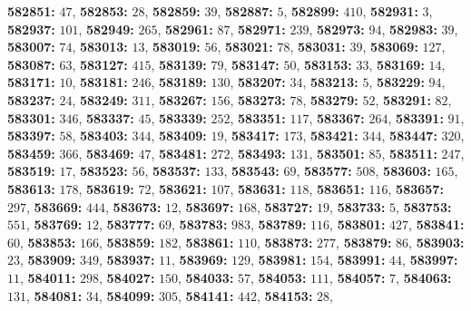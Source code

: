 \textsf{\bfseries 582851:} $47$, \textsf{\bfseries 582853:} $28$, \textsf{\bfseries 582859:} $39$, \textsf{\bfseries 582887:} $5$, \textsf{\bfseries 582899:} $410$, \textsf{\bfseries 582931:} $3$, \textsf{\bfseries 582937:} $101$, \textsf{\bfseries 582949:} $265$, \textsf{\bfseries 582961:} $87$, \textsf{\bfseries 582971:} $239$, \textsf{\bfseries 582973:} $94$, \textsf{\bfseries 582983:} $39$, \textsf{\bfseries 583007:} $74$, \textsf{\bfseries 583013:} $13$, \textsf{\bfseries 583019:} $56$, \textsf{\bfseries 583021:} $78$, \textsf{\bfseries 583031:} $39$, \textsf{\bfseries 583069:} $127$, \textsf{\bfseries 583087:} $63$, \textsf{\bfseries 583127:} $415$, \textsf{\bfseries 583139:} $79$, \textsf{\bfseries 583147:} $50$, \textsf{\bfseries 583153:} $33$, \textsf{\bfseries 583169:} $14$, \textsf{\bfseries 583171:} $10$, \textsf{\bfseries 583181:} $246$, \textsf{\bfseries 583189:} $130$, \textsf{\bfseries 583207:} $34$, \textsf{\bfseries 583213:} $5$, \textsf{\bfseries 583229:} $94$, \textsf{\bfseries 583237:} $24$, \textsf{\bfseries 583249:} $311$, \textsf{\bfseries 583267:} $156$, \textsf{\bfseries 583273:} $78$, \textsf{\bfseries 583279:} $52$, \textsf{\bfseries 583291:} $82$, \textsf{\bfseries 583301:} $346$, \textsf{\bfseries 583337:} $45$, \textsf{\bfseries 583339:} $252$, \textsf{\bfseries 583351:} $117$, \textsf{\bfseries 583367:} $264$, \textsf{\bfseries 583391:} $91$, \textsf{\bfseries 583397:} $58$, \textsf{\bfseries 583403:} $344$, \textsf{\bfseries 583409:} $19$, \textsf{\bfseries 583417:} $173$, \textsf{\bfseries 583421:} $344$, \textsf{\bfseries 583447:} $320$, \textsf{\bfseries 583459:} $366$, \textsf{\bfseries 583469:} $47$, \textsf{\bfseries 583481:} $272$, \textsf{\bfseries 583493:} $131$, \textsf{\bfseries 583501:} $85$, \textsf{\bfseries 583511:} $247$, \textsf{\bfseries 583519:} $17$, \textsf{\bfseries 583523:} $56$, \textsf{\bfseries 583537:} $133$, \textsf{\bfseries 583543:} $69$, \textsf{\bfseries 583577:} $508$, \textsf{\bfseries 583603:} $165$, \textsf{\bfseries 583613:} $178$, \textsf{\bfseries 583619:} $72$, \textsf{\bfseries 583621:} $107$, \textsf{\bfseries 583631:} $118$, \textsf{\bfseries 583651:} $116$, \textsf{\bfseries 583657:} $297$, \textsf{\bfseries 583669:} $444$, \textsf{\bfseries 583673:} $12$, \textsf{\bfseries 583697:} $168$, \textsf{\bfseries 583727:} $19$, \textsf{\bfseries 583733:} $5$, \textsf{\bfseries 583753:} $551$, \textsf{\bfseries 583769:} $12$, \textsf{\bfseries 583777:} $69$, \textsf{\bfseries 583783:} $983$, \textsf{\bfseries 583789:} $116$, \textsf{\bfseries 583801:} $427$, \textsf{\bfseries 583841:} $60$, \textsf{\bfseries 583853:} $166$, \textsf{\bfseries 583859:} $182$, \textsf{\bfseries 583861:} $110$, \textsf{\bfseries 583873:} $277$, \textsf{\bfseries 583879:} $86$, \textsf{\bfseries 583903:} $23$, \textsf{\bfseries 583909:} $349$, \textsf{\bfseries 583937:} $11$, \textsf{\bfseries 583969:} $129$, \textsf{\bfseries 583981:} $154$, \textsf{\bfseries 583991:} $44$, \textsf{\bfseries 583997:} $11$, \textsf{\bfseries 584011:} $298$, \textsf{\bfseries 584027:} $150$, \textsf{\bfseries 584033:} $57$, \textsf{\bfseries 584053:} $111$, \textsf{\bfseries 584057:} $7$, \textsf{\bfseries 584063:} $131$, \textsf{\bfseries 584081:} $34$, \textsf{\bfseries 584099:} $305$, \textsf{\bfseries 584141:} $442$, \textsf{\bfseries 584153:} $28$, 
